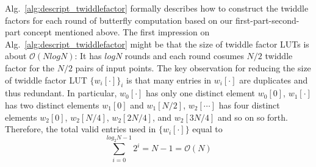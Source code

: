 \documentclass{iacrtrans}
\theoremstyle{plain}
\begin{document}
Alg.~\ref{alg:descript_twiddlefactor} formally describes how to construct the twiddle factors for each round of butterfly computation based on our first-part-second-part concept mentioned above.
The first impression on Alg.~\ref{alg:descript_twiddlefactor} might be that the size of twiddle factor LUTs is about $\mathcal{O}(NlogN)$: It has $logN$ rounds and each round cosumes $N/2$ twiddle factor for the $N/2$ pairs of input points.  The key observation for reducing the size of twiddle factor LUT $\{w_i[\cdot]\}_i$ is that many entries in $w_i[\cdot]$ are duplicates and thus redundant. In particular, $w_0[\cdot]$ has only one distinct element $w_0[0]$, $w_1[\cdot]$ has two distinct elements $w_1[0]$ and $w_1[N/2]$, $w_2[\cdots]$ has four distinct elements $w_2[0]$, $w_2[N/4]$, $w_2[2N/4]$, and $w_2[3N/4]$ and so on so forth. Therefore, the total valid entries used in $\{w_i[\cdot]\}$ equal to
\[
\sum_{i=0}^{log_2N-1} 2^i = N-1 = \mathcal{O}(N) 
\]
\end{document}
